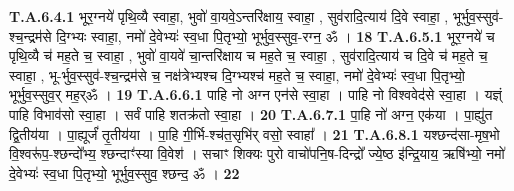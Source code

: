 \documentclass[17pt]{extarticle}
\begin{document}
                                \textbf{ T.A.6.4.1} \newline
                  भूर॒ग्नये॑ पृथि॒व्यै स्वाहा॒,  भुवो॑ वा॒यवे॒ऽन्तरि॑क्षाय॒ स्वाहा॒ , सुव॑रादि॒त्याय॑ दि॒वे स्वाहा॒ ,  भूर्भुव॒स्सुव॑-श्च॒न्द्रम॑से दि॒ग्भ्यः स्वाहा॒,  नमो॑ दे॒वेभ्यः॑ स्व॒धा पि॒तृभ्यो॒ भूर्भुव॒स्सुव॒-रग्न॒ ॐ । \textbf{ 18} \newline
                  \newline
                                                         \textbf{} \newline \newline
                                \textbf{ T.A.6.5.1} \newline
                  भूर॒ग्नये॑ च पृथि॒व्यै च॑ मह॒ते च॒ स्वाहा॒ , भुवो॑ वा॒यवे॑ चा॒न्तरि॑क्षाय च मह॒ते च॒ स्वाहा॒ , सुव॑रादि॒त्याय॑ च दि॒वे च॑ मह॒ते च॒ स्वाहा॒ ,  भू-र्भुव॒स्सुव॑-श्च॒न्द्रम॑से च॒ नक्ष॑त्रेभ्यश्च दि॒ग्भ्यश्च॑ मह॒ते च॒ स्वाहा॒,  नमो॑ दे॒वेभ्यः॑ स्व॒धा पि॒तृभ्यो॒ भूर्भुव॒स्सुव॒र् मह॒र्ॐ । \textbf{ 19} \newline
                  \newline
                                                         \textbf{} \newline \newline
                                \textbf{ T.A.6.6.1} \newline
                  पाहि नो अग्न एन॑से स्वा॒हा । पाहि नो विश्ववेद॑से स्वा॒हा । यज्ञ्ं पाहि विभाव॑सो स्वा॒हा । सर्वं पाहि शतक्र॑तो स्वा॒हा । \textbf{ 20} \newline
                  \newline
                                                         \textbf{} \newline \newline
                                \textbf{ T.A.6.7.1} \newline
                  पा॒हि नो॑ अग्न॒ एक॑या । पा॒ह्यु॑त द्वि॒तीय॑या । पा॒ह्यूर्जं॑ तृ॒तीय॑या ।  पा॒हि गी॒र्भि-श्च॑त॒सृभि॑र् वसो॒ स्वाहा᳚ । \textbf{ 21} \newline
                  \newline
                                                         \textbf{} \newline \newline
                                \textbf{ T.A.6.8.1} \newline
                  यश्छन्द॑सा-मृष॒भो वि॒श्वरू॑प॒-श्छन्दो᳚भ्य॒ श्छन्दाꣳ॑स्या वि॒वेश॑ । सचाꣳ शिक्यः पुरो वाचो॑पनि॒ष-दिन्द्रो᳚ ज्ये॒ष्ठ इ॑न्द्रि॒याय॒ ऋषि॑भ्यो॒  नमो॑ दे॒वेभ्यः॑ स्व॒धा पि॒तृभ्यो॒ भूर्भुव॒स्सुव॒ श्छन्द॒ ॐ । \textbf{ 22} \newline
\end{document}
